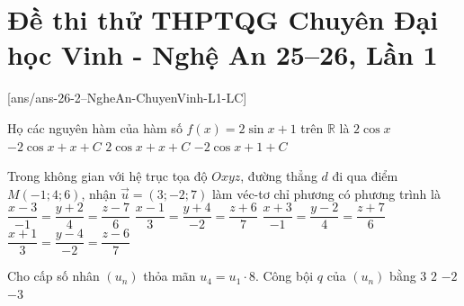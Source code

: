 \section*{Đề thi thử THPTQG Chuyên Đại học Vinh - Nghệ An 25--26, Lần 1}

\caulc
{}[ans/ans-26-2--NgheAn-ChuyenVinh-L1-LC]
\begin{ex}%
Họ các nguyên hàm của hàm số $f(x)=2 \sin x+1$ trên $\mathbb{R}$ là
\choice
{$2 \cos x$}
{\True $-2 \cos x+x+C$}
{$2 \cos x+x+C$}
{$-2 \cos x+1+C$}
\end{ex}
\begin{ex}%
Trong không gian với hệ trục tọa độ $Oxyz$, đường thẳng $d$ đi qua điểm $M(-1; 4; 6)$, nhận $\overrightarrow{u}=(3; -2; 7)$ làm véc-tơ chỉ phương có phương trình là
\choice
{$\dfrac{x-3}{-1}=\dfrac{y+2}{4}=\dfrac{z-7}{6}$}
{$\dfrac{x-1}{3}=\dfrac{y+4}{-2}=\dfrac{z+6}{7}$}
{$\dfrac{x+3}{-1}=\dfrac{y-2}{4}=\dfrac{z+7}{6}$}
{\True  $\dfrac{x+1}{3}=\dfrac{y-4}{-2}=\dfrac{z-6}{7}$}
\end{ex}
\begin{ex}%
Cho cấp số nhân $\left(u_n\right)$ thỏa mãn $u_4=u_1\cdot 8$. Công bội $q$ của $\left(u_n\right)$ bằng
\choice
{$3$}
{\True $2$}
{$-2$}
{$-3$}
\end{ex}
